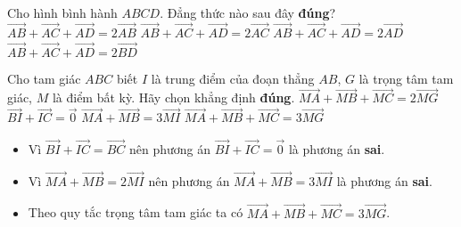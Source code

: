 \begin{ex}%
	Cho hình bình hành $ABCD$. Đẳng thức nào sau đây \textbf{đúng}?
	\choice
	{$\overrightarrow{AB}+\overrightarrow{AC}+\overrightarrow{AD}=2\overrightarrow{AB}$}
	{\True $\overrightarrow{AB}+\overrightarrow{AC}+\overrightarrow{AD}=2\overrightarrow{AC}$}
	{$\overrightarrow{AB}+\overrightarrow{AC}+\overrightarrow{AD}=2\overrightarrow{AD}$}
	{$\overrightarrow{AB}+\overrightarrow{AC}+\overrightarrow{AD}=2\overrightarrow{BD}$}
\end{ex}
\begin{ex}%
	Cho tam giác $ABC$ biết $I$ là trung điểm của đoạn thẳng $AB$, $G$ là trọng tâm tam giác, $M$ là điểm bất kỳ. Hãy chọn khẳng định \textbf{đúng}.
	\choice
	{$\overrightarrow{MA}+\overrightarrow{MB}+\overrightarrow{MC}=2\overrightarrow{MG}$}
	{$\overrightarrow{BI}+\overrightarrow{IC}=\overrightarrow{0}$}
	{$\overrightarrow{MA}+\overrightarrow{MB}=3\overrightarrow{MI}$}
	{\True $\overrightarrow{MA}+\overrightarrow{MB}+\overrightarrow{MC}=3\overrightarrow{MG}$}
	\loigiai
	{\begin{itemize}
			\item Vì $\overrightarrow{BI}+\overrightarrow{IC}=\overrightarrow{BC}$ nên phương án $\overrightarrow{BI}+\overrightarrow{IC}=\overrightarrow{0}$ là phương án \textbf{sai}.
			\item Vì $\overrightarrow{MA}+\overrightarrow{MB}=2\overrightarrow{MI}$ nên phương án $\overrightarrow{MA}+\overrightarrow{MB}=3\overrightarrow{MI}$ là phương án \textbf{sai}.
			\item Theo quy tắc trọng tâm tam giác ta có $ \overrightarrow{MA}+\overrightarrow{MB}+\overrightarrow{MC} = 3\overrightarrow{MG}$.
		\end{itemize} }
\end{ex}
